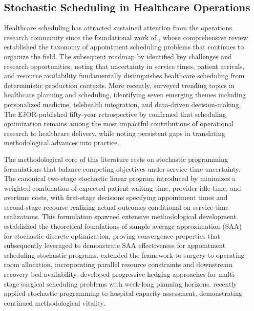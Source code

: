 \documentclass[11pt,a4paper]{article}
\begin{document}
\subsection{Stochastic Scheduling in Healthcare Operations}

Healthcare scheduling has attracted sustained attention from the operations research community since the foundational work of \citet{cayirli2003outpatient}, whose comprehensive review established the taxonomy of appointment scheduling problems that continues to organize the field. The subsequent roadmap by \citet{gupta2008appointment} identified key challenges and research opportunities, noting that uncertainty in service times, patient arrivals, and resource availability fundamentally distinguishes healthcare scheduling from deterministic production contexts. More recently, \citet{youn2022planning} surveyed trending topics in healthcare planning and scheduling, identifying seven emerging themes including personalized medicine, telehealth integration, and data-driven decision-making. The EJOR-published fifty-year retrospective by \citet{belien2025fifty} confirmed that scheduling optimization remains among the most impactful contributions of operational research to healthcare delivery, while noting persistent gaps in translating methodological advances into practice.

The methodological core of this literature rests on stochastic programming formulations that balance competing objectives under service time uncertainty. The canonical two-stage stochastic linear program introduced by \citet{denton2003sequential} minimizes a weighted combination of expected patient waiting time, provider idle time, and overtime costs, with first-stage decisions specifying appointment times and second-stage recourse realizing actual outcomes conditional on service time realizations. This formulation spawned extensive methodological development. \citet{kleywegt2002sample} established the theoretical foundations of sample average approximation (SAA) for stochastic discrete optimization, proving convergence properties that \citet{mancilla2012sample} subsequently leveraged to demonstrate SAA effectiveness for appointment scheduling stochastic programs. \citet{denton2010optimal} extended the framework to surgery-to-operating-room allocation, incorporating parallel resource constraints and downstream recovery bed availability. \citet{gul2015progressive} developed progressive hedging approaches for multi-stage surgical scheduling problems with week-long planning horizons. \citet{marchesi2025stochastic} recently applied stochastic programming to hospital capacity assessment, demonstrating continued methodological vitality.
\end{document}
